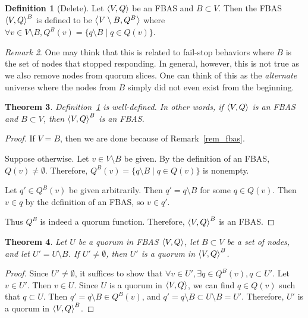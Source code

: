 \documentclass[12pt, psamsfonts]{amsart}
\newtheorem{thm}{Theorem}[subsection]
\theoremstyle{definition}
\newtheorem{defn}[thm]{Definition}
\theoremstyle{remark}
\newtheorem{rem}[thm]{Remark}
\numberwithin{equation}{subsection}
\begin{document}
\begin{defn}[Delete]\label{delete_fbas}
    Let $\ev{V, Q}$ be an FBAS and $B \subset V$.
    Then the FBAS $\ev{V, Q}^B$ is defined to be $\ev{V \setminus B, Q^B}$ where $\forall v \in V \setminus B, Q^B(v) = \{ q \setminus B \mid q \in Q(v) \}$.
\end{defn}

\begin{rem}
    One may think that this is related to fail-stop behaviors where $B$ is the set of nodes that stopped responding.
    In general, however, this is not true as we also remove nodes from quorum slices.
    One can think of this as the \textit{alternate} universe where the nodes from $B$ simply did not even exist from the beginning.
\end{rem}

\begin{thm}
    Definition~\ref{delete_fbas} is well-defined.
    In other words, if $\ev{V, Q}$ is an FBAS and $B \subset V$, then $\ev{V, Q}^B$ is an FBAS\@.
\end{thm}

\begin{proof}
    If $V = B$, then we are done because of Remark~\ref{rem_fbas}.

    Suppose otherwise.
    Let $v \in V \setminus B$ be given.
    By the definition of an FBAS, $Q(v) \ne \emptyset$.
    Therefore, $Q^B(v) = \{ q \setminus B \mid q \in Q(v) \}$ is nonempty.

    Let $q' \in Q^B(v)$ be given arbitrarily.
    Then $q' = q \setminus B$ for some $q \in Q(v)$.
    Then $v \in q$ by the definition of an FBAS, so $v \in q'$.
    
    Thus $Q^B$ is indeed a quorum function.
    Therefore, $\ev{V, Q}^B$ is an FBAS\@.
\end{proof}

\begin{thm}\label{quorum_delete_fbas}
    Let $U$ be a quorum in FBAS $\ev{V, Q}$, let $B \subset V$ be a set of nodes, and let $U' = U \setminus B$.
    If $U' \ne \emptyset$, then $U'$ is a quorum in $\ev{V, Q}^B$.
\end{thm}

\begin{proof}
    Since $U' \ne \emptyset$, it suffices to show that $\forall v \in U', \exists q \in Q^B(v), q \subset U'$.
    Let $v \in U'$.
    Then $v \in U$.
    Since $U$ is a quorum in $\ev{V, Q}$, we can find $q \in Q(v)$ such that $q \subset U$.
    Then $q' = q \setminus B \in Q^B(v)$, and $q' = q \setminus B \subset U \setminus B = U'$.
    Therefore, $U'$ is a quorum in $\ev{V, Q}^B$.
\end{proof}
\end{document}
